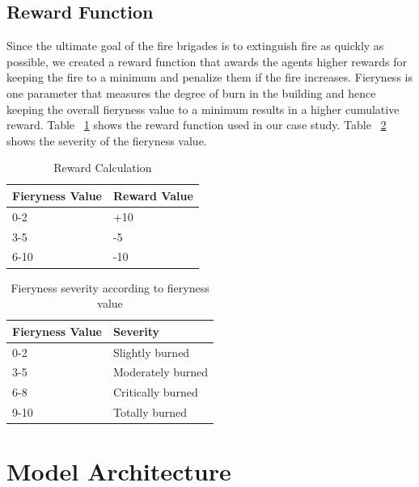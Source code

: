 \documentclass[12pt]{report}
\begin{document}
\subsection{Reward Function}
        
Since the ultimate goal of the fire brigades is to extinguish fire as quickly as possible, we created a reward function that awards the agents higher rewards for keeping the fire to a minimum and penalize them if the fire increases. Fieryness is one parameter that measures the degree of burn in the building and hence keeping the overall fieryness value to a minimum results in a higher cumulative reward. Table ~\ref{table:RewardsTable} shows the reward function used in our case study. Table ~\ref{table:FierynessSeverity} shows the severity of the fieryness value. 
     
\begin{table} [!h]
\begin{center}
 \begin{tabular}{l | l} 
 \hline
 Fieryness Value & Reward Value  \\ [0.5ex] 
 \hline\hline
 0-2 & +10 \\
 3-5 & -5\\
 6-10 & -10  \\ 
 \hline
\end{tabular}
\caption{Reward Calculation}
\label{table:RewardsTable}
\end{center}
\end{table}
 
 
\begin{table} [!h]
\begin{center}
 \begin{tabular}{l | l} 
 \hline
 Fieryness Value & Severity  \\ [0.5ex] 
 \hline\hline
 0-2 & Slightly burned \\
 3-5 & Moderately burned\\
 6-8 & Critically burned\\ 
 9-10 & Totally burned\\
 \hline
\end{tabular}
\caption{Fieryness severity according to fieryness value}
\label{table:FierynessSeverity}
\end{center}
\end{table}

\section{Model Architecture}
\end{document}
